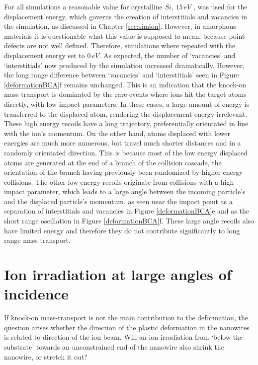 For all simulations a reasonable value for crystalline $Si$, $15\,eV$ \cite{corbett_production_1965}, was used for the displacement energy, which governs the creation of interstitials and vacancies in the simulation, as discussed in Chapter \ref{sec:simion}. However, in amorphous materials it is questionable what this value is supposed to mean, because point defects are not well defined. Therefore, simulations where repeated with the displacement energy set to $0\,eV$. As expected, the number of `vacancies' and `interstitials' now produced by the simulation increased dramatically. However, the long range difference between `vacancies' and `interstitials' seen in Figure \ref{deformationBCA}f remains unchanged. This is an indication that the knock-on mass transport is dominated by the rare events where ions hit the target atoms directly, with low impact parameters. In these cases, a large amount of energy is transferred to the displaced atom, rendering the displacement energy irrelevant. These high energy recoils have a long trajectory, preferentially orientated in line with the ion's momentum. On the other hand, atoms displaced with lower energies are much more numerous, but travel much shorter distances and in a randomly orientated direction. This is because most of the low energy displaced atoms are generated at the end of a branch of the collision cascade, the orientation of the branch having previously been randomized by higher energy collisions. The other low energy recoils originate from collisions with a high impact parameter, which leads to a large angle between the incoming particle's and the displaced particle's momentum, as seen near the impact point as a separation of interstitials and vacancies in Figure \ref{deformationBCA}e and as the short range oscillation in Figure \ref{deformationBCA}f. These large angle recoils also have limited energy and therefore they do not contribute significantly to long range mass transport.

\clearpage
\section{Ion irradiation at large angles of incidence}

If knock-on mass-transport is not the main contribution to the deformation, the question arises whether the direction of the plastic deformation in the nanowires is related to direction of the ion beam. Will an ion irradiation from `below the substrate' towards an unconstrained end of the nanowire also shrink the nanowire, or stretch it out? 

